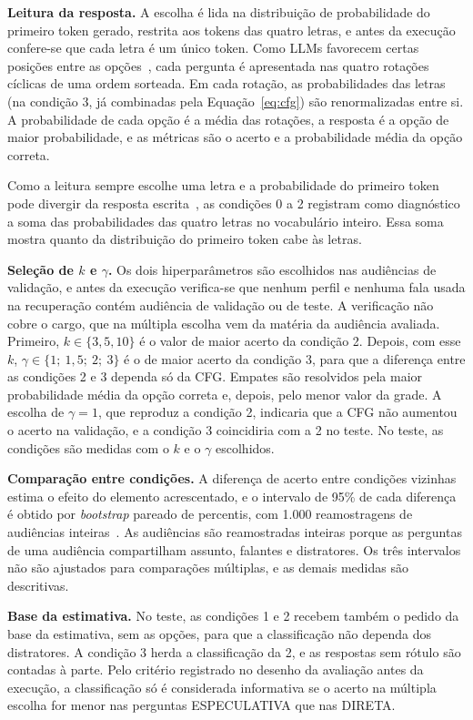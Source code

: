 \textbf{Leitura da resposta.} A escolha é lida na distribuição de probabilidade do primeiro token
gerado, restrita aos tokens das quatro letras, e antes da execução confere-se que cada letra é um
único token. Como LLMs favorecem certas posições entre as
opções~\citep{zheng2024large,pezeshkpour2024large}, cada pergunta é apresentada nas quatro rotações
cíclicas de uma ordem sorteada. Em cada rotação, as probabilidades das letras (na condição 3, já
combinadas pela Equação~\ref{eq:cfg}) são renormalizadas entre si. A probabilidade de cada opção é a
média das rotações, a resposta é a opção de maior probabilidade, e as métricas são o acerto e a
probabilidade média da opção correta.

Como a leitura sempre escolhe uma letra e a probabilidade do primeiro token pode divergir da
resposta escrita~\citep{wang2024answer}, as condições 0 a 2 registram como diagnóstico a soma das
probabilidades das quatro letras no vocabulário inteiro. Essa soma mostra quanto da distribuição do
primeiro token cabe às letras.

\textbf{Seleção de $k$ e $\gamma$.} Os dois hiperparâmetros são escolhidos nas audiências de
validação, e antes da execução verifica-se que nenhum perfil e nenhuma fala usada na recuperação
contém audiência de validação ou de teste. A verificação não cobre o cargo, que na múltipla escolha
vem da matéria da audiência avaliada. Primeiro, $k \in \{3, 5, 10\}$ é o valor de maior acerto da
condição 2. Depois, com esse $k$, $\gamma \in \{1;\ 1{,}5;\ 2;\ 3\}$ é o de maior acerto da condição 3,
para que a diferença entre as condições 2 e 3 dependa só da CFG. Empates são resolvidos pela maior
probabilidade média da opção correta e, depois, pelo menor valor da grade. A escolha de
$\gamma = 1$, que reproduz a condição 2, indicaria que a CFG não aumentou o acerto na validação, e a
condição 3 coincidiria com a 2 no teste. No teste, as condições são medidas com o $k$ e o $\gamma$
escolhidos.

\textbf{Comparação entre condições.} A diferença de acerto entre condições vizinhas estima o efeito
do elemento acrescentado, e o intervalo de 95\% de cada diferença é obtido por \textit{bootstrap}
pareado de percentis, com 1.000 reamostragens de audiências inteiras~\citep{efron1993introduction}.
As audiências são reamostradas inteiras porque as perguntas de uma audiência compartilham assunto,
falantes e distratores. Os três intervalos não são ajustados para comparações múltiplas, e as demais
medidas são descritivas.

\textbf{Base da estimativa.} No teste, as condições 1 e 2 recebem também o pedido da base da
estimativa, sem as opções, para que a classificação não dependa dos distratores. A condição 3 herda
a classificação da 2, e as respostas sem rótulo são contadas à parte. Pelo critério registrado no
desenho da avaliação antes da execução, a classificação só é considerada informativa se o acerto na
múltipla escolha for menor nas perguntas ESPECULATIVA que nas DIRETA.


